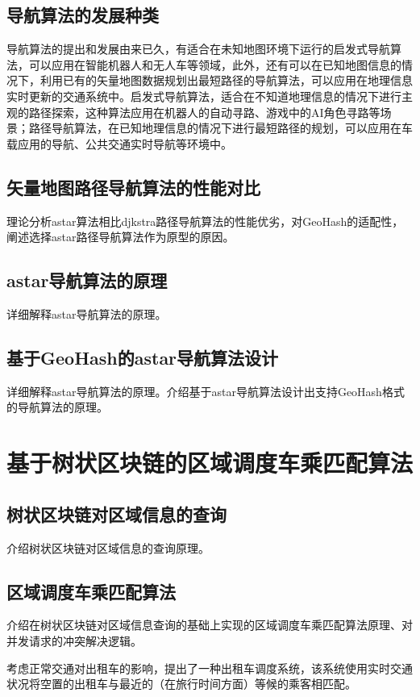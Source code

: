 \subsection{导航算法的发展种类}
导航算法的提出和发展由来已久，有适合在未知地图环境下运行的启发式导航算法，可以应用在智能机器人和无人车等领域，此外，还有可以在已知地图信息的情况下，利用已有的矢量地图数据规划出最短路径的导航算法，可以应用在地理信息实时更新的交通系统中。启发式导航算法，适合在不知道地理信息的情况下进行主观的路径探索，这种算法应用在机器人的自动寻路、游戏中的AI角色寻路等场景；路径导航算法，在已知地理信息的情况下进行最短路径的规划，可以应用在车载应用的导航、公共交通实时导航等环境中。
\subsection{矢量地图路径导航算法的性能对比}
理论分析astar算法相比djkstra路径导航算法的性能优劣，对GeoHash的适配性，阐述选择astar路径导航算法作为原型的原因。
\subsection{astar导航算法的原理}
详细解释astar导航算法的原理。
\subsection{基于GeoHash的astar导航算法设计}
详细解释astar导航算法的原理。介绍基于astar导航算法设计出支持GeoHash格式的导航算法的原理。

\section{基于树状区块链的区域调度车乘匹配算法}
\subsection{树状区块链对区域信息的查询}
介绍树状区块链对区域信息的查询原理。
\subsection{区域调度车乘匹配算法}
介绍在树状区块链对区域信息查询的基础上实现的区域调度车乘匹配算法原理、对并发请求的冲突解决逻辑。

考虑正常交通对出租车的影响，提出了一种出租车调度系统，该系统使用实时交通状况将空置的出租车与最近的（在旅行时间方面）等候的乘客相匹配。